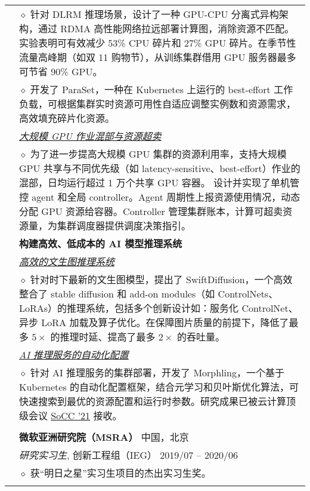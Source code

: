 \documentclass[letterpaper, 10pt]{article}
\begin{document}
\begin{longtable}{p{0.7in}p{6.0in}}
    & $\diamond$ 针对 DLRM 推理场景，设计了一种 GPU-CPU 分离式异构架构，通过 RDMA 高性能网络拉远部署计算图，消除资源不匹配。实验表明可有效减少 53\% CPU 碎片和 27\% GPU 碎片。在季节性流量高峰期（如双 11 购物节），从训练集群借用 GPU 服务器最多可节省 90\% GPU。 \\

    & $\diamond$ 开发了 ParaSet，一种在 Kubernetes 上运行的 best-effort 工作负载，可根据集群实时资源可用性自适应调整实例数和资源需求，高效填充碎片化资源。 \\

& \textit{\underline{大规模 GPU 作业混部与资源超卖}} \\
    & $\diamond$
    为了进一步提高大规模 GPU 集群的资源利用率，支持大规模 GPU 共享与不同优先级（如 latency-sensitive、best-effort）作业的混部，日均运行超过 1 万个共享 GPU 容器。
    设计并实现了单机管控 agent 和全局 controller。Agent 周期性上报资源使用情况，动态分配 GPU 资源给容器。Controller 管理集群账本，计算可超卖资源量，为集群调度器提供调度决策指引。
    \\

& \textbf{构建高效、低成本的 AI 模型推理系统} \\

& \textit{\underline{高效的文生图推理系统}} \\

    & $\diamond$ 针对时下最新的文生图模型，提出了 SwiftDiffusion，一个高效整合了 stable diffusion 和 add-on modules（如 ControlNets、LoRAs）的推理系统，包括多个创新设计如：服务化 ControlNet、异步 LoRA 加载及算子优化。在保障图片质量的前提下，降低了最多 $5\times$ 的推理时延、提高了最多 $2\times$ 的吞吐量。 \\

& \textit{\underline{AI 推理服务的自动化配置}} \\

    & $\diamond$ 针对 AI 推理服务的集群部署，开发了 Morphling，一个基于 Kubernetes 的自动化配置框架，结合元学习和贝叶斯优化算法，可快速搜索到最优的资源配置和运行时参数。研究成果已被云计算顶级会议 \underline{SoCC '21} 接收。 \\
& \\

& {\textbf{微软亚洲研究院（MSRA）}} \hfill 中国，北京 \\
& \textit{研究实习生}, 创新工程组（IEG） \hfill 2019/07 -- 2020/06 \\
& $\diamond$ 获“明日之星”实习生项目的杰出实习生奖。 \\
& \\


\end{longtable}
\end{document}
